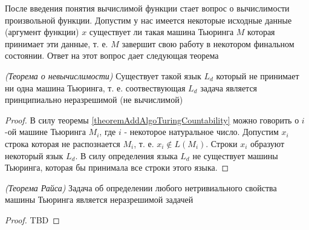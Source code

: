 После введения понятия вычислимой функции стает вопрос о вычислимости
произвольной функции. Допустим у нас имеется некоторые исходные данные
(аргумент функции) $x$ существует ли такая машина Тьюринга $M$ которая
принимает эти данные, т. е. $M$ завершит свою работу в некотором
финальном состоянии. Ответ на этот вопрос дает следующая теорема

\begin{theorem}
\emph{(Теорема о невычислимости)}
Существует такой язык $L_d$ который не принимает ни одна машина
Тьюринга, т. е. соотвествующая $L_d$ задача является принципиально
неразрешимой (не вычислимой) 
\end{theorem}

\begin{proof}
В силу теоремы \ref{theoremAddAlgoTuringCountability} можно говорить о
$i$-ой машине Тьюринга $M_i$, где $i$ - некоторое натуральное
число. Допустим $x_i$ строка которая не распознается $M_i$, т. е. 
$x_i \notin L\left(M_i\right)$. Строки $x_i$ образуют некоторый язык
$L_d$. В силу определения языка $L_d$ не существует машины Тьюринга,
которая бы принимала все строки этого языка.
\end{proof}

\begin{theorem}
\emph{(Теорема Райса)}
Задача об определении любого нетривиального свойства машины Тьюринга
является неразрешимой задачей
\end{theorem}

\begin{proof}
TBD
\end{proof}

